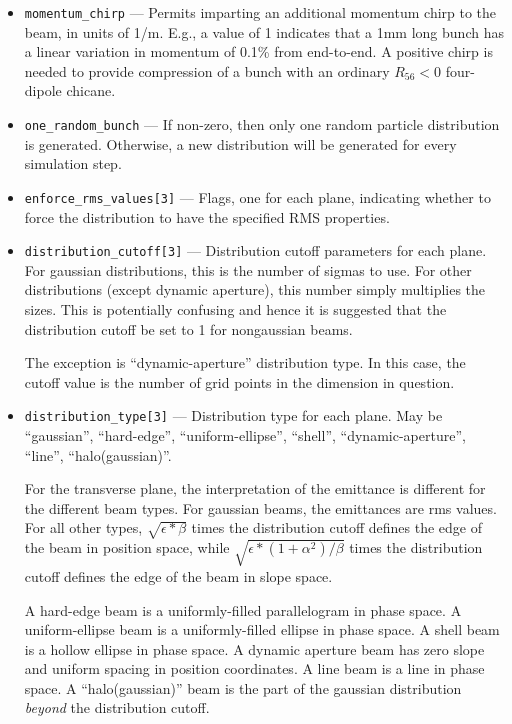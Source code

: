 \documentclass[11pt]{article}
\begin{document}
\begin{itemize}
\item \verb|momentum_chirp| --- Permits imparting an additional
momentum chirp to the beam, in units of 1/m.  E.g., a value of 1
indicates that a 1mm long bunch has a linear variation in momentum of
0.1\% from end-to-end.  A positive chirp is needed to provide
compression of a bunch with an ordinary $R_{56}<0$ four-dipole
chicane.

\item \verb|one_random_bunch| --- If non-zero, then only one random
particle distribution is generated.  Otherwise, a new distribution
will be generated for every simulation step.

\item \verb|enforce_rms_values[3]| --- Flags, one for each plane,
indicating whether to force the distribution to have the specified RMS
properties.

\item \verb|distribution_cutoff[3]| --- Distribution cutoff parameters
for each plane.  For gaussian distributions, this is the number of
sigmas to use.  For other distributions (except dynamic aperture),
this number simply multiplies the sizes.  This is potentially
confusing and hence it is suggested that the distribution cutoff be
set to 1 for nongaussian beams.

The exception is ``dynamic-aperture'' distribution type.  In this case,
the cutoff value is the number of grid points in the dimension in question.

\item \verb|distribution_type[3]| --- Distribution type for each
plane.  May be ``gaussian'', ``hard-edge'', ``uniform-ellipse'',
``shell'', ``dynamic-aperture'', ``line'', ``halo(gaussian)''.

For the transverse plane, the interpretation of the emittance is
different for the different beam types.  For gaussian beams, the
emittances are rms values.  For all other types, $\sqrt{\epsilon*\beta}$
times the distribution cutoff defines the edge of the beam in position
space, while $\sqrt{\epsilon*(1+\alpha^2)/\beta}$ times the distribution
cutoff defines the edge of the beam in slope space.  

A hard-edge beam is a uniformly-filled parallelogram in phase space.
A uniform-ellipse beam is a uniformly-filled ellipse in phase space.
A shell beam is a hollow ellipse in phase space.  A dynamic aperture
beam has zero slope and uniform spacing in position coordinates.  A
line beam is a line in phase space.  A ``halo(gaussian)'' beam is
the part of the gaussian distribution {\em beyond} the distribution cutoff.


\end{itemize}
\end{document}
